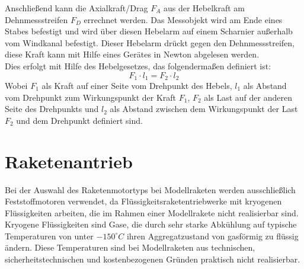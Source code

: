 Anschließend kann die Axialkraft/Drag $F_A$ aus der Hebelkraft am Dehnmessstreifen $F_D$ errechnet werden. Das Messobjekt wird am Ende eines Stabes befestigt und wird über diesen Hebelarm auf einem Scharnier außerhalb vom Windkanal befestigt. Dieser Hebelarm drückt gegen den Dehnmessstreifen, diese Kraft kann mit Hilfe eines Gerätes in Newton abgelesen werden. 
\\
Dies erfolgt mit Hilfe des Hebelgesetzes, das folgendermaßen definiert ist:
\begin{equation}
    F_1 \cdot l_1 = F_2 \cdot l_2
    \label{eq:lever_law}
\end{equation}
Wobei $F_1$ als Kraft auf einer Seite vom Drehpunkt des Hebels, $l_1$ als Abstand vom Drehpunkt zum Wirkungspunkt der Kraft $F_1$, $F_2$ als Last auf der anderen Seite des Drehpunkts und $l_2$ als Abstand zwischen dem Wirkungspunkt der Last $F_2$ und dem Drehpunkt definiert sind.

\chapter{Raketenantrieb}
\label{ch:rocket_engine}
Bei der Auswahl des Raketenmotortyps bei Modellraketen werden ausschließlich Feststoffmotoren verwendet, da Flüssigkeitsraketentriebwerke mit kryogenen Flüssigkeiten arbeiten, die im Rahmen einer Modellrakete nicht realisierbar sind.  Kryogene Flüssigkeiten sind Gase, die durch sehr starke Abkühlung auf typische Temperaturen von unter $-150^\circ C$ ihren Aggregatzustand von gasförmig zu flüssig ändern. Diese Temperaturen sind bei Modellraketen aus technischen, sicherheitstechnischen und kostenbezogenen Gründen praktisch nicht realisierbar.

